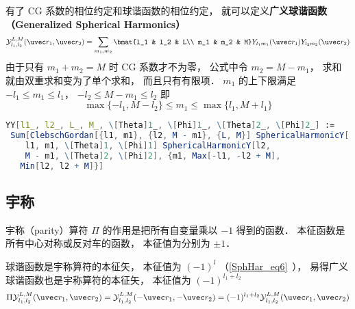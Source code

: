 
有了 CG 系数的相位约定和球谐函数的相位约定， 就可以定义\textbf{广义球谐函数（Generalized Spherical Harmonics）}
\begin{equation}\label{GenYlm_eq1}
\mathcal{Y}_{l_1,l_2}^{L,M}(\uvec r_1, \uvec r_2) = \sum_{m_1, m_2} \bmat{l_1 & l_2 & L\\ m_1 & m_2 & M} Y_{l_1 m_1}(\uvec r_1) Y_{l_2 m_2} (\uvec r_2)
\end{equation}
由于只有 $m_1 + m_2 = M$ 时 CG 系数才不为零， 公式中令 $m_2 = M - m_1$， 求和就由双重求和变为了单个求和， 而且只有有限项． $m_1$ 的上下限满足 $-l_1 \leqslant m_1 \leqslant l_1$， $-l_2 \leqslant M-m_1 \leqslant l_2$ 即
\begin{equation}
\max\{-l_1, M-l_2\} \leqslant m_1 \leqslant \max\{l_1, M+l_1\}
\end{equation}

\begin{lstlisting}[language=Mathematica]
YY[l1_, l2_, L_, M_, \[Theta]1_, \[Phi]1_, \[Theta]2_, \[Phi]2_] := 
 Sum[ClebschGordan[{l1, m1}, {l2, M - m1}, {L, M}] SphericalHarmonicY[
    l1, m1, \[Theta]1, \[Phi]1] SphericalHarmonicY[l2, 
    M - m1, \[Theta]2, \[Phi]2], {m1, Max[-l1, -l2 + M], 
   Min[l2, l2 + M]}]
\end{lstlisting}

\subsection{宇称}
宇称（parity）算符 $\Pi$ 的作用是把所有自变量乘以 $-1$ 得到的函数． 本征函数是所有中心对称或反对车的函数， 本征值为分别为 $\pm 1$．

球谐函数是宇称算符的本征矢， 本征值为 $(-1)^l$ （\autoref{SphHar_eq6}~）， 易得广义球谐函数也是宇称算符的本征矢， 本征值为 $(-1)^{l_1+l_2}$
\begin{equation}
\Pi \mathcal{Y}_{l_1,l_2}^{L,M}(\uvec r_1, \uvec r_2) =  \mathcal{Y}_{l_1,l_2}^{L,M}(-\uvec r_1, -\uvec r_2) = (-1)^{l_1+l_2} \mathcal{Y}_{l_1,l_2}^{L,M}(\uvec r_1, \uvec r_2)
\end{equation}

